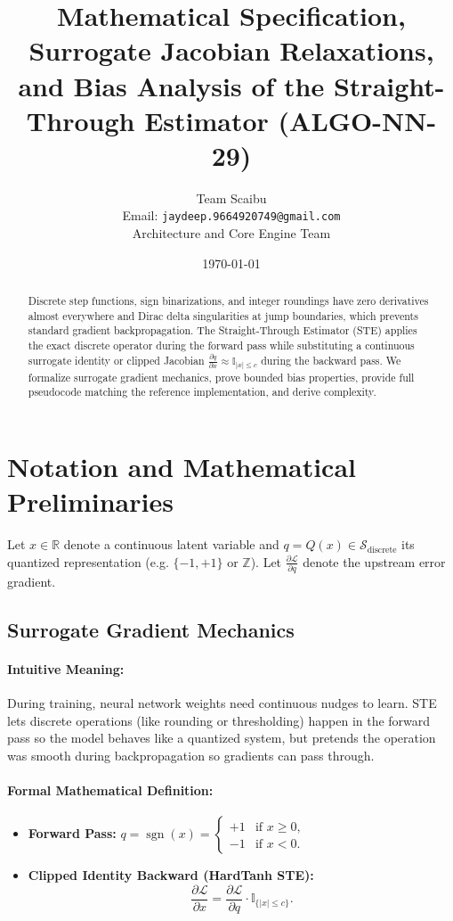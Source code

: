 \documentclass[11pt]{article}
\title{\textbf{Mathematical Specification, Surrogate Jacobian Relaxations, and Bias Analysis of the Straight-Through Estimator (ALGO-NN-29)}}
\author{Team Scaibu \\ \small Email: \texttt{jaydeep.9664920749@gmail.com} \\ \small Architecture and Core Engine Team}
\date{\today}
\begin{document}
\maketitle

\begin{abstract}
Discrete step functions, sign binarizations, and integer roundings have zero derivatives almost everywhere and Dirac delta singularities at jump boundaries, which prevents standard gradient backpropagation. The Straight-Through Estimator (STE) applies the exact discrete operator during the forward pass while substituting a continuous surrogate identity or clipped Jacobian $\frac{\partial q}{\partial x} \approx \mathbb{I}_{|x| \le c}$ during the backward pass. We formalize surrogate gradient mechanics, prove bounded bias properties, provide full pseudocode matching the reference implementation, and derive complexity.
\end{abstract}

\section{Notation and Mathematical Preliminaries}
\label{sec:notation}

Let $x \in \mathbb{R}$ denote a continuous latent variable and $q = Q(x) \in \mathcal{S}_{\mathrm{discrete}}$ its quantized representation (e.g. $\{-1, +1\}$ or $\mathbb{Z}$). Let $\frac{\partial \mathcal{L}}{\partial q}$ denote the upstream error gradient.

\subsection{Surrogate Gradient Mechanics}
\paragraph{Intuitive Meaning:} During training, neural network weights need continuous nudges to learn. STE lets discrete operations (like rounding or thresholding) happen in the forward pass so the model behaves like a quantized system, but pretends the operation was smooth during backpropagation so gradients can pass through.

\paragraph{Formal Mathematical Definition:}
\begin{itemize}
    \item \textbf{Forward Pass:} $q = \operatorname{sgn}(x) = \begin{cases} +1 & \text{if } x \ge 0, \\ -1 & \text{if } x < 0. \end{cases}$
    \item \textbf{Clipped Identity Backward (HardTanh STE):}
    \begin{equation}
    \label{eq:ste_backward}
    \frac{\partial \mathcal{L}}{\partial x} = \frac{\partial \mathcal{L}}{\partial q} \cdot \mathbb{I}_{\{|x| \le c\}}.
    \end{equation}
\end{itemize}
\end{document}
